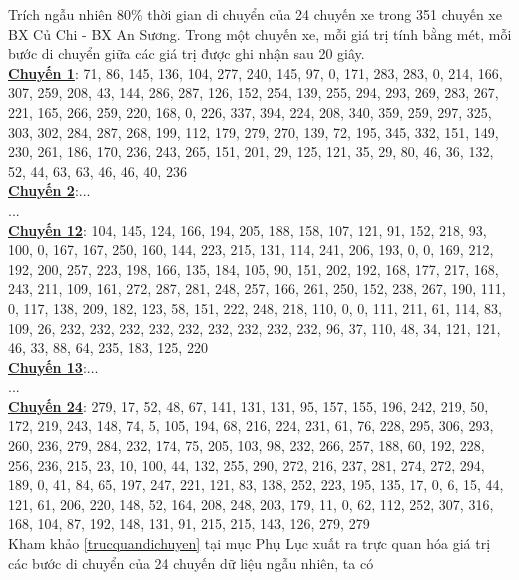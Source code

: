 \documentclass[a4paper, 13pt]{report}
\begin{document}
\FloatBarrier
Trích ngẫu nhiên 80\% thời gian di chuyển của 24 chuyến xe trong 351 chuyến xe BX Củ Chi - BX An Sương. Trong một chuyến xe, mỗi giá trị tính bằng mét, mỗi bước di chuyển giữa các giá trị được ghi nhận sau 20 giây.\\
\textbf{\underline{Chuyến 1}}: 
71, 86, 145, 136, 104, 277, 240, 145, 97, 0, 171, 283, 283, 0, 214, 166, 307, 259, 208, 43, 144, 286, 287, 126, 152, 254, 139, 255, 294, 293, 269, 283, 267, 221, 165, 266, 259, 220, 168, 0, 226, 337, 394, 224, 208, 340, 359, 259, 297, 325, 303, 302, 284, 287, 268, 199, 112, 179, 279, 270, 139, 72, 195, 345, 332, 151, 149, 230, 261, 186, 170, 236, 243, 265, 151, 201, 29, 125, 121, 35, 29, 80, 46, 36, 132, 52, 44, 63, 63, 46, 46, 40, 236\\
\textbf{\underline{Chuyến 2}}:...\\
...\\
\textbf{\underline{Chuyến 12}}: 104, 145, 124, 166, 194, 205, 188, 158, 107, 121, 91, 152, 218, 93, 100, 0, 167, 167, 250, 160, 144, 223, 215, 131, 114, 241, 206, 193, 0, 0, 169, 212, 192, 200, 257, 223, 198, 166, 135, 184, 105, 90, 151, 202, 192, 168, 177, 217, 168, 243, 211, 109, 161, 272, 287, 281, 248, 257, 166, 261, 250, 152, 238, 267, 190, 111, 0, 117, 138, 209, 182, 123, 58, 151, 222, 248, 218, 110, 0, 0, 111, 211, 61, 114, 83, 109, 26, 232, 232, 232, 232, 232, 232, 232, 232, 232, 96, 37, 110, 48, 34, 121, 121, 46, 33, 88, 64, 235, 183, 125, 220\\
\textbf{\underline{Chuyến 13}}:...\\
...\\
\textbf{\underline{Chuyến 24}}: 279, 17, 52, 48, 67, 141, 131, 131, 95, 157, 155, 196, 242, 219, 50, 172, 219, 243, 148, 74, 5, 105, 194, 68, 216, 224, 231, 61, 76, 228, 295, 306, 293, 260, 236, 279, 284, 232, 174, 75, 205, 103, 98, 232, 266, 257, 188, 60, 192, 228, 256, 236, 215, 23, 10, 100, 44, 132, 255, 290, 272, 216, 237, 281, 274, 272, 294, 189, 0, 41, 84, 65, 197, 247, 221, 121, 83, 138, 252, 223, 195, 135, 17, 0, 6, 15, 44, 121, 61, 206, 220, 148, 52, 164, 208, 248, 203, 179, 11, 0, 62, 112, 252, 307, 316, 168, 104, 87, 192, 148, 131, 91, 215, 215, 143, 126, 279, 279\\
Kham khảo \ref{trucquandichuyen} tại mục Phụ Lục xuất ra trực quan hóa giá trị các bước di chuyển của 24 chuyến dữ liệu ngẫu nhiên, ta có\\
\end{document}
